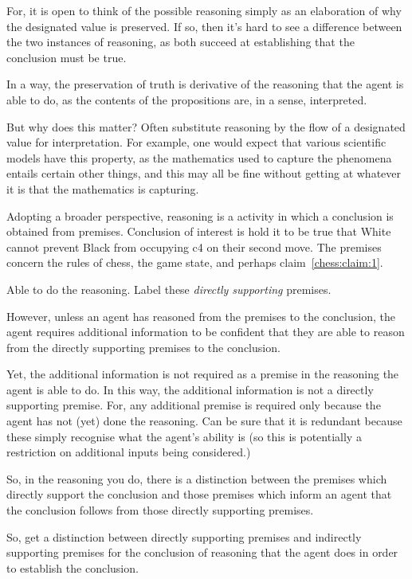\documentclass[10pt]{article}
\begin{document}
{
  \begin{note}[Important]
    For, it is open to think of the possible reasoning simply as an elaboration of why the designated value is preserved.
    If so, then it's hard to see a difference between the two instances of reasoning, as both succeed at establishing that the conclusion must be true.

    In a way, the preservation of truth is derivative of the reasoning that the agent is able to do, as the contents of the propositions are, in a sense, interpreted.
  \end{note}

  But why does this matter?
  Often substitute reasoning by the flow of a designated value for interpretation.
  For example, one would expect that various scientific models have this property, as the mathematics used to capture the phenomena entails certain other things, and this may all be fine without getting at whatever it is that the mathematics is capturing.
}

Adopting a broader perspective, reasoning is a activity in which a conclusion is obtained from premises.
Conclusion of interest is hold it to be true that White cannot prevent Black from occupying c4 on their second move.
The premises concern the rules of chess, the game state, and perhaps claim~\ref{chess:claim:1}.

Able to do the reasoning.
Label these \emph{directly supporting} premises.

However, unless an agent has reasoned from the premises to the conclusion, the agent requires additional information to be confident that they are able to reason from the directly supporting premises to the conclusion.

Yet, the additional information is not required as a premise in the reasoning the agent is able to do.
In this way, the additional information is not a directly supporting premise.
For, any additional premise is required only because the agent has not (yet) done the reasoning.
Can be sure that it is redundant because these simply recognise what the agent's ability is (so this is potentially a restriction on additional inputs being considered.)

So, in the reasoning you do, there is a distinction between the premises which directly support the conclusion and those premises which inform an agent that the conclusion follows from those directly supporting premises.




So, get a distinction between directly supporting premises and indirectly supporting premises for the conclusion of reasoning that the agent does in order to establish the conclusion.
\end{document}
